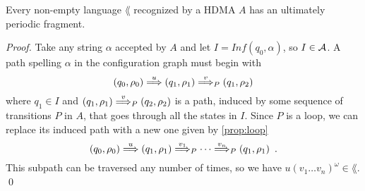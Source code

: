\begin{theorem}
Every non-empty language $\lang$ recognized by a HDMA $A$ has an ultimately periodic fragment.
\end{theorem}
\begin{proof}

Take any string $\alpha$ accepted by $A$ and let $I = Inf(q_0,\alpha)$, so $I \in \mathcal{A}$. A path spelling $\alpha$ in the configuration graph must  begin with
\[
	(q_0,\rho_0) \overset{u}{\Longrightarrow} (q_1,\rho_1) \overset{v}{\Longrightarrow}_{P} (q_1,\rho_2)
\]
where $q_1 \in I$ and $(q_1,\rho_1) \overset{v}{\Longrightarrow}_{P} (q_2,\rho_2)$ is a path, induced by some sequence of transitions $P$ in $A$, that goes through all the states in $I$. Since $P$ is a loop, we can replace its induced path with a new one given by \cref{prop:loop} 
\[
	(q_0,\rho_0) \overset{u}{\Longrightarrow} (q_1,\rho_1) \overset{v_1}{\Longrightarrow}_{P} \cdots \overset{v_n}{\Longrightarrow}_{P} (q_1,\rho_1) \enspace .
\]
This subpath can be traversed any number of times, so we have $u(v_1\dots v_n)^\omega \in \lang$.
\qed
\end{proof}
